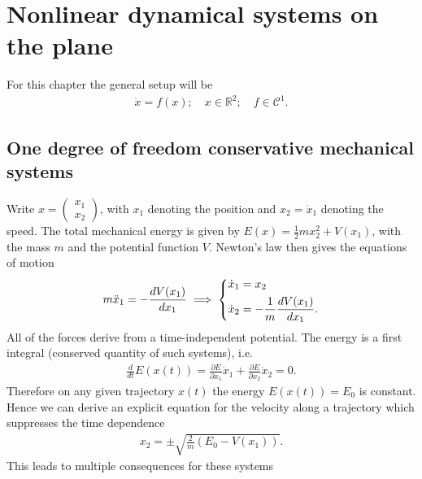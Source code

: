 \chapter{Nonlinear dynamical systems on the plane}
For this chapter the general setup will be 
\begin{align}
	\dot{x} = f(x);\quad x \in \mathbb{R}^{2};\quad f\in \mathcal{C}^1.
\end{align}
\section{One degree of freedom conservative mechanical systems}
Write $x = 
\begin{pmatrix}
	x_1 \\ x_2
\end{pmatrix}
$, with $x_1$ denoting the position and $x_2=\dot{x}_1$ denoting the speed. The total mechanical energy is given by $E(x) = \frac{1}{2}mx_2^2  + V(x_1)$, with the mass $m$ and the potential function $V$. Newton's law then gives the equations of motion 
\begin{align}
	m \ddot{x}_1 = -\frac{dV(x_1)}{dx_1} \implies 
	\begin{dcases}
		\dot{x}_1 = x_2 \\
		\dot{x}_2 = - \frac{1}{m} \frac{dV(x_1)}{dx_1}.
	\end{dcases}
\end{align}
All of the forces derive from a time-independent potential. The energy is a first integral (conserved quantity of such systems), i.e.
\begin{align}
	\frac{d}{dt}E(x(t)) = \frac{\partial E}{\partial x_1}\dot{x}_1 + \frac{\partial E}{\partial x_2}\dot{x}_2 = 0.
\end{align}
Therefore on any given trajectory $x(t)$ the energy $E(x(t))=E_0 $ is constant. Hence we can derive an explicit equation for the velocity along a trajectory which suppresses the time dependence
\begin{align}
	x_2 = \pm \sqrt{\frac{2}{m}(E_0 -V(x_1))}.
\end{align}
This leads to multiple consequences for these systems
